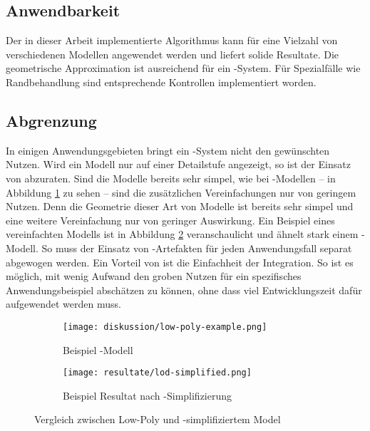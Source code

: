 \subsection{Anwendbarkeit}

Der in dieser Arbeit implementierte Algorithmus kann für eine Vielzahl von verschiedenen Modellen angewendet werden und liefert solide Resultate. Die geometrische Approximation ist ausreichend für ein -System. Für Spezialfälle wie Randbehandlung sind entsprechende Kontrollen implementiert worden.

\subsection{Abgrenzung}

In einigen Anwendungsgebieten bringt ein -System nicht den gewünschten Nutzen. Wird ein Modell nur auf einer Detailstufe angezeigt, so ist der Einsatz von  abzuraten. Sind die Modelle bereits sehr simpel, wie bei -Modellen – in Abbildung \ref{fig:lowPolyExample} zu sehen – sind die zusätzlichen Vereinfachungen nur von geringem Nutzen. Denn die Geometrie dieser Art von Modelle ist bereits sehr simpel und eine weitere Vereinfachung nur von geringer Auswirkung. Ein Beispiel eines vereinfachten Modells ist in Abbildung \ref{fig:lodModelSimplified} veranschaulicht und ähnelt stark einem -Modell.
So muss der Einsatz von -Artefakten für jeden Anwendungsfall separat abgewogen werden. Ein Vorteil von  ist die Einfachheit der Integration. So ist es möglich, mit wenig Aufwand den groben Nutzen für ein spezifisches Anwendungsbeispiel abschätzen zu können, ohne dass viel Entwicklungszeit dafür aufgewendet werden muss.

\begin{figure}[H]
  \begin{subfigure}{.5\textwidth}
    \centering
    \texttt{[image: diskussion/low-poly-example.png]}
    \caption{Beispiel -Modell}
    \label{fig:lowPolyExample}
  \end{subfigure}%
  \begin{subfigure}{.5\textwidth}
    \centering
    \texttt{[image: resultate/lod-simplified.png]}
    \caption{Beispiel Resultat nach -Simplifizierung}
    \label{fig:lodModelSimplified}
  \end{subfigure}
  \caption{Vergleich zwischen Low-Poly und -simplifiziertem Model}
  \label{fig:comparisonLowPolyAndLOD}
\end{figure}


